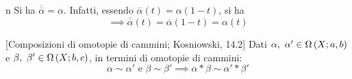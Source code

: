 \begin{remark}{n}
Si ha $\overline{\overline{\alpha}}=\alpha$. Infatti, essendo $\overline{\alpha}\left(t\right)=\alpha\left(1-t\right)$, si ha
\begin{equation*}
	\implies\overline{\overline{\alpha}}\left(t\right)=\overline{\alpha}\left(1-t\right)=\alpha\left(t\right)
\end{equation*}
\end{remark}
\begin{lemma}{}[Composizioni di omotopie di cammini; Kosniowski, 14.2]\label{compoomotopecammini}
Dati $\alpha,\ \alpha'\in\Omega\left(X; a,b\right)$ e $\beta,\ \beta '\in\Omega\left(X; b,c\right)$, in termini di omotopie di cammini:
	\begin{equation*}
		\alpha\sim \alpha'\text{ e }\beta\sim \beta'\implies \alpha\ast\beta\sim\alpha'\ast\beta'
	\end{equation*}
\end{lemma}
